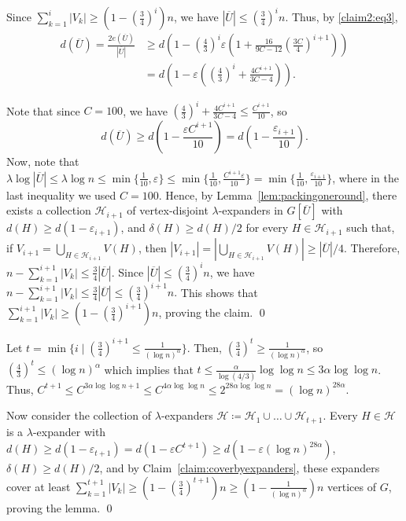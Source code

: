 \documentclass[10pt]{article}
\theoremstyle{plain}
\numberwithin{theorem}{section}
\theoremstyle{definition}
\theoremstyle{remark}
\renewenvironment{proof}[1][]{\begin{trivlist}
\item[\hspace{\labelsep}{\bf\noindent Proof#1.\/}] }{\qed\end{trivlist}}
\newcommand{\cH}{\mathcal{H}}
\newcommand{\eps}{\varepsilon}
\theoremstyle{plain}
\begin{document}
\begin{proof}[ of \Cref{lem:expandercoverweak}]
\begin{proof}[ of claim]
		Since $\sum_{k = 1}^i |V_k| \ge (1 - (\frac{3}{4})^i)n$, we have $|\overline{U}| \le (\frac{3}{4})^i n$. Thus, by \eqref{claim2:eq3}, 
		\begin{align*}
			d(\overline{U}) 
			= \frac{2 e(\overline{U})}{|\overline{U}|} 
			& \ge d\left(1 - \left(\frac{4}{3}\right)^i \eps \left(1 + \frac{16}{9C - 12} \left(\frac{3 C}{4}\right)^{i+1}  \right) \right) \\
			& = d \left(1 - \eps \left(\left(\frac{4}{3}\right)^i + \frac{4 C^{i+1}}{3C - 4}\right) \right).
		\end{align*}

		Note that since $C = 100$, we have $\left(\frac{4}{3}\right)^i + \frac{4 C^{i+1}}{3C - 4} \le \frac{C^{i+1}}{10}$, so
		\begin{equation*}
			d(\overline{U}) \ge d \left(1 - \frac{\eps C^{i+1}}{10}\right)  = d \left(1 - \frac{\eps_{i+1}}{10}\right).
		\end{equation*}
		Now, note that $\lambda \log |\overline{U}| \le \lambda \log n \le \min \{ \frac{1}{10},  \eps \} \le \min \{ \frac{1}{10},  \frac{C^{i+1} \eps}{10} \} = \min \{ \frac{1}{10},  \frac{\eps_{i+1}}{10} \}$, where in the last inequality we used $C = 100$. Hence, by Lemma~\ref{lem:packingoneround}, there exists a collection $\cH_{i+1}$ of vertex-disjoint $\lambda$-expanders in $G[\overline{U}]$ with $d(H) \ge d(1 - \eps_{i+1})$, and $\delta(H) \ge d(H)/2$ for every $H \in \cH_{i+1}$ such that, if $V_{i+1} = \bigcup_{H \in \cH_{i+1}} V(H)$, then $|V_{i+1}| = |\bigcup_{H \in \cH_{i+1}} V(H)|\ge |\overline{U}|/4$. Therefore, $n - \sum_{k = 1}^{i+1} |V_k| \le \frac{3}{4}|\overline{U}|$. Since $|\overline{U}| \le (\frac{3}{4})^i n$, we have 
		$ n - \sum_{k = 1}^{i+1} |V_k| \le \frac{3}{4}|\overline{U}| \le (\frac{3}{4})^{i+1}n.$ This shows that $\sum_{k = 1}^{i+1} |V_k| \ge (1-(\frac{3}{4})^{i+1})n$, proving the claim.
	\end{proof}

Let $t = \min \{ i \mid  (\frac{3}{4})^{i+1} \le \frac{1}{(\log n)^{\alpha}}\}$. Then, $(\frac{3}{4})^t \ge \frac{1}{(\log n)^{\alpha}}$, so $(\frac{4}{3})^t \le (\log n)^{\alpha}$ which implies that $t \le \frac{\alpha }{\log (4/3)} \log\log n \le 3 \alpha \log\log n$. Thus, $C^{t+1} \le C^{3 \alpha \log\log n + 1} \le C^{4 \alpha \log\log n} \le 2^{28 \alpha \log\log n}  = (\log n)^{28 \alpha}.$ 

Now consider the collection of $\lambda$-expanders $\cH \coloneqq \cH_1 \cup \ldots \cup \cH_{t+1}$. Every $H \in \cH$ is a $\lambda$-expander with $d(H) \ge d(1 - \eps_{t+1}) = d(1 - \eps C^{t+1}) \ge d(1 - \eps (\log n)^{28 \alpha})$, $\delta(H) \ge d(H)/2$, and by Claim~\ref{claim:coverbyexpanders}, these expanders cover at least $\sum_{k = 1}^{t+1} |V_k| \ge (1 - (\frac{3}{4})^{t+1})n \ge (1 - \frac{1}{(\log n)^{\alpha}})n$ vertices of $G$, proving the lemma.
\end{proof}
\end{document}
